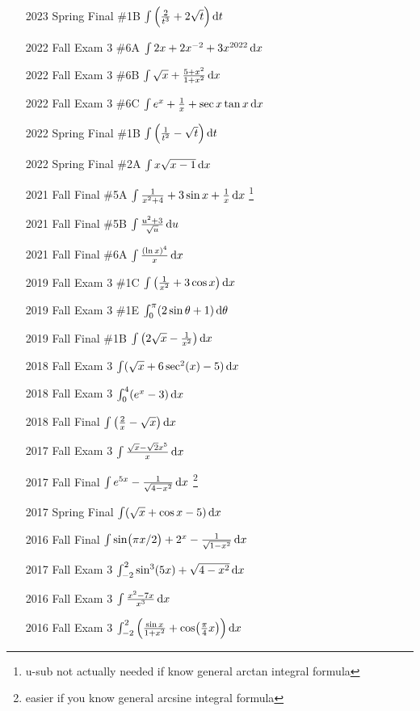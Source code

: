\documentclass[10pt]{scrartcl}
\theoremstyle{definition}
\begin{document}
\begin{enumerate}
\item[2023 Spring Final \#1B] $\int\left( \frac{2}{t^3} + 2\sqrt{t} \right) \dif t$
\item[2022 Fall Exam 3 \#6A] $\int 2x+2x^{-2} + 3x^{2022} \dif x$
\item[2022 Fall Exam 3 \#6B] $\int \sqrt{x} + \frac{5+x^2}{1+x^2} \dif x$
\item[2022 Fall Exam 3 \#6C] $\int e^x + \frac1x + \sec x \tan x \dif x$
\item[2022 Spring Final \#1B] $\int \left( \frac1{t^2} - \sqrt t \right) \dif t$
\item[2022 Spring Final \#2A] $\int x\sqrt{x-1}\dif x$
\item[2021 Fall Final \#5A] $\int \frac{1}{x^2+4} + 3\sin x + \frac 1x \dif x$ \footnote{u-sub not actually needed if know general arctan integral formula}
\item[2021 Fall Final \#5B] $\int \frac{u^2+3}{\sqrt u} \dif u$
\item[2021 Fall Final \#6A] $\int \frac{(\ln x)^4}{x} \dif x$
\item [2019 Fall Exam 3 \#1C] $\int \left( \frac{1}{x^2} + 3\cos x \right) \dif x$
\item [2019 Fall Exam 3 \#1E] $\int_0^\pi (2\sin \theta+1) \dif \theta$
\item [2019 Fall Final \#1B] $\int \left(2\sqrt x - \frac{1}{x^2}\right) \dif x$
\item [2018 Fall Exam 3] $\int (\sqrt x + 6\sec^2(x) - 5) \dif x$
\item [2018 Fall Exam 3] $\int_0^4 (e^x - 3) \dif x$
\item [2018 Fall Final] $\int \left( \frac 2x - \sqrt{x} \right) \dif x$
\item [2017 Fall Exam 3] $\int \frac{\sqrt x - \sqrt 2 x^5}{x} \dif x$
\item [2017 Fall Final] $\int e^{5x} - \frac{1}{\sqrt{4-x^2}} \dif x$ \footnote{easier if you know general arcsine integral formula}
\item [2017 Spring Final] $\int (\sqrt x + \cos x - 5) \dif x$
\item [2016 Fall Final] $\int \sin(\pi x/ 2) + 2^x - \frac{1}{\sqrt{1-x^2}} \dif x$
\item [2017 Fall Exam 3] $\int_{-2}^2 \sin^3(5x) + \sqrt{4-x^2} \dif x$
\item [2016 Fall Exam 3] $\int \frac{x^2 - 7x}{x^3} \dif x$
\item [2016 Fall Exam 3] $\int_{-2}^2 \left( \frac{\sin x}{1+x^2} + \cos(\frac{\pi}4 x) \right) \dif x$

\end{enumerate}
\end{document}
